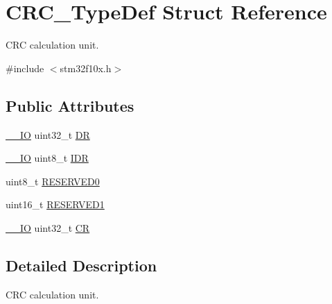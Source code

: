 \hypertarget{struct_c_r_c___type_def}{\section{C\-R\-C\-\_\-\-Type\-Def Struct Reference}
\label{struct_c_r_c___type_def}
}


C\-R\-C calculation unit.  




{\ttfamily \#include $<$stm32f10x.\-h$>$}

\subsection*{Public Attributes}
\begin{DoxyCompactItemize}
\item 
\hyperlink{group___c_m_s_i_s__core__definitions_gaec43007d9998a0a0e01faede4133d6be}{\-\_\-\-\_\-\-I\-O} uint32\-\_\-t \hyperlink{struct_c_r_c___type_def_a50cb22870dbb9001241cec694994e5ef}{D\-R}
\item 
\hyperlink{group___c_m_s_i_s__core__definitions_gaec43007d9998a0a0e01faede4133d6be}{\-\_\-\-\_\-\-I\-O} uint8\-\_\-t \hyperlink{struct_c_r_c___type_def_ad84e8694cd4b5375ee533c2d875c3b5a}{I\-D\-R}
\item 
uint8\-\_\-t \hyperlink{struct_c_r_c___type_def_a70dfd1730dba65041550ef55a44db87c}{R\-E\-S\-E\-R\-V\-E\-D0}
\item 
uint16\-\_\-t \hyperlink{struct_c_r_c___type_def_a8b205c6e25b1808ac016db2356b3021d}{R\-E\-S\-E\-R\-V\-E\-D1}
\item 
\hyperlink{group___c_m_s_i_s__core__definitions_gaec43007d9998a0a0e01faede4133d6be}{\-\_\-\-\_\-\-I\-O} uint32\-\_\-t \hyperlink{struct_c_r_c___type_def_af33fa5c173e1c102e6d0242fe60e569f}{C\-R}
\end{DoxyCompactItemize}


\subsection{Detailed Description}
C\-R\-C calculation unit. 

